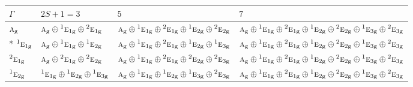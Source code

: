\documentclass[10pt,a4paper]{article}
\numberwithin{equation}{section}
\newcommand{\irr}[1]{\text{\normalfont\scshape #1}}
\newcommand{\conjpair}[1]{{}^{#1}}
\newcommand{\ptag}[1]{\mathrm{#1}}
\begin{document}
{\small\setlength{\tabcolsep}{3pt}\begin{longtable}{@{}l>{\RaggedRight\arraybackslash}p{}>{\RaggedRight\arraybackslash}p{}>{\RaggedRight\arraybackslash}p{}@{}}\toprule
$\Gamma$ & $2S + 1 = 3$ & $5$ & $7$\\\midrule\endhead
\bottomrule\endfoot\endlastfoot
$\irr{a}_{\ptag{g}}$ & $\irr{a}_{\ptag{g}}\oplus \conjpair{1}\irr{e}_{1\ptag{g}}\oplus \conjpair{2}\irr{e}_{1\ptag{g}}$ & $\irr{a}_{\ptag{g}}\oplus \conjpair{1}\irr{e}_{1\ptag{g}}\oplus \conjpair{2}\irr{e}_{1\ptag{g}}\oplus \conjpair{1}\irr{e}_{2\ptag{g}}\oplus \conjpair{2}\irr{e}_{2\ptag{g}}$ & $\irr{a}_{\ptag{g}}\oplus \conjpair{1}\irr{e}_{1\ptag{g}}\oplus \conjpair{2}\irr{e}_{1\ptag{g}}\oplus \conjpair{1}\irr{e}_{2\ptag{g}}\oplus \conjpair{2}\irr{e}_{2\ptag{g}}\oplus \conjpair{1}\irr{e}_{3\ptag{g}}\oplus \conjpair{2}\irr{e}_{3\ptag{g}}$\\*
$\conjpair{1}\irr{e}_{1\ptag{g}}$ & $\irr{a}_{\ptag{g}}\oplus \conjpair{1}\irr{e}_{1\ptag{g}}\oplus \conjpair{1}\irr{e}_{2\ptag{g}}$ & $\irr{a}_{\ptag{g}}\oplus \conjpair{1}\irr{e}_{1\ptag{g}}\oplus \conjpair{2}\irr{e}_{1\ptag{g}}\oplus \conjpair{1}\irr{e}_{2\ptag{g}}\oplus \conjpair{1}\irr{e}_{3\ptag{g}}$ & $\irr{a}_{\ptag{g}}\oplus \conjpair{1}\irr{e}_{1\ptag{g}}\oplus \conjpair{2}\irr{e}_{1\ptag{g}}\oplus \conjpair{1}\irr{e}_{2\ptag{g}}\oplus \conjpair{2}\irr{e}_{2\ptag{g}}\oplus \conjpair{1}\irr{e}_{3\ptag{g}}\oplus \conjpair{2}\irr{e}_{3\ptag{g}}$\\
$\conjpair{2}\irr{e}_{1\ptag{g}}$ & $\irr{a}_{\ptag{g}}\oplus \conjpair{2}\irr{e}_{1\ptag{g}}\oplus \conjpair{2}\irr{e}_{2\ptag{g}}$ & $\irr{a}_{\ptag{g}}\oplus \conjpair{1}\irr{e}_{1\ptag{g}}\oplus \conjpair{2}\irr{e}_{1\ptag{g}}\oplus \conjpair{2}\irr{e}_{2\ptag{g}}\oplus \conjpair{2}\irr{e}_{3\ptag{g}}$ & $\irr{a}_{\ptag{g}}\oplus \conjpair{1}\irr{e}_{1\ptag{g}}\oplus \conjpair{2}\irr{e}_{1\ptag{g}}\oplus \conjpair{1}\irr{e}_{2\ptag{g}}\oplus \conjpair{2}\irr{e}_{2\ptag{g}}\oplus \conjpair{1}\irr{e}_{3\ptag{g}}\oplus \conjpair{2}\irr{e}_{3\ptag{g}}$\\
$\conjpair{1}\irr{e}_{2\ptag{g}}$ & $\conjpair{1}\irr{e}_{1\ptag{g}}\oplus \conjpair{1}\irr{e}_{2\ptag{g}}\oplus \conjpair{1}\irr{e}_{3\ptag{g}}$ & $\irr{a}_{\ptag{g}}\oplus \conjpair{1}\irr{e}_{1\ptag{g}}\oplus \conjpair{1}\irr{e}_{2\ptag{g}}\oplus \conjpair{1}\irr{e}_{3\ptag{g}}\oplus \conjpair{2}\irr{e}_{3\ptag{g}}$ & $\irr{a}_{\ptag{g}}\oplus \conjpair{1}\irr{e}_{1\ptag{g}}\oplus \conjpair{2}\irr{e}_{1\ptag{g}}\oplus \conjpair{1}\irr{e}_{2\ptag{g}}\oplus \conjpair{2}\irr{e}_{2\ptag{g}}\oplus \conjpair{1}\irr{e}_{3\ptag{g}}\oplus \conjpair{2}\irr{e}_{3\ptag{g}}$\\

\end{longtable}}
\end{document}
